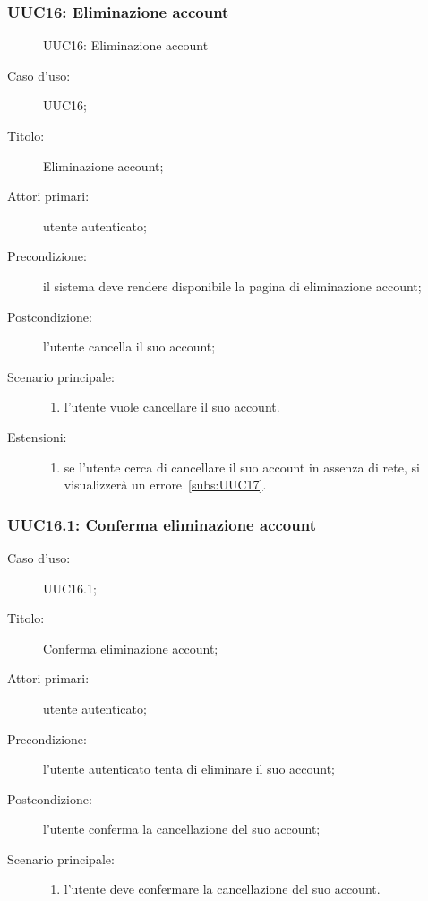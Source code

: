 \documentclass[../../../analisi-dei-requisiti.tex]{subfiles}
\begin{document}
\subsubsection{UUC16: Eliminazione account}%
\label{subs:UUC16}

\begin{figure}[H]
  \centering
  \caption{UUC16: Eliminazione account}%
  \label{fig:UUC16}
\end{figure}

\begin{description}
  \item[Caso d'uso:] UUC16;
  \item[Titolo:] Eliminazione account;
  \item[Attori primari:] utente autenticato;
  \item[Precondizione:] il sistema deve rendere disponibile la pagina di eliminazione account;
  \item[Postcondizione:] l'utente cancella il suo account;
  \item[Scenario principale:]
        \begin{enumerate}
          \item l'utente vuole cancellare il suo account.
        \end{enumerate}
  \item[Estensioni:]
        \begin{enumerate}
          \item se l'utente cerca di cancellare il suo account in assenza di rete, si visualizzerà un errore~\ref{subs:UUC17}.
        \end{enumerate}
\end{description}

\subsubsection{UUC16.1: Conferma eliminazione account}%
\label{subs:UUC16.1}

\begin{description}
  \item[Caso d'uso:] UUC16.1;
  \item[Titolo:] Conferma eliminazione account;
  \item[Attori primari:] utente autenticato;
  \item[Precondizione:] l'utente autenticato tenta di eliminare il suo account;
  \item[Postcondizione:] l'utente conferma la cancellazione del suo account;
  \item[Scenario principale:]
        \begin{enumerate}
          \item l'utente deve confermare la cancellazione del suo account.
        \end{enumerate}
\end{description}
\end{document}
